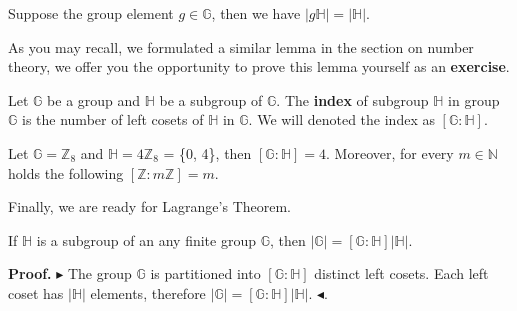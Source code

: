 \documentclass[../lecture-notes-148x210.tex]{subfiles}
\begin{document}
\begin{lemma}
    Suppose the group element $g \in \mathbb{G}$, then we have $\left| g\mathbb{H} \right| = \left| \mathbb{H} \right|$.
\end{lemma}

As you may recall, we formulated a similar lemma in the section on number theory,
we offer you the opportunity to prove this lemma yourself as an \textbf{exercise}.

\begin{definition}
    Let $\mathbb{G}$ be a group and $\mathbb{H}$ be a subgroup of $\mathbb{G}$. 
    The \textbf{index} of subgroup $\mathbb{H}$ in group $\mathbb{G}$ is the number of left cosets of 
    $\mathbb{H}$ in $\mathbb{G}$. We will denoted the index as $\left[ \mathbb{G} : \mathbb{H} \right]$.
\end{definition}

\begin{example}
    Let $\mathbb{G} = \mathbb{Z}_{8}$ and $\mathbb{H} = 4\mathbb{Z}_{8}$ = \{0, 4\}, 
    then $\left[ \mathbb{G} : \mathbb{H} \right] = 4$. Moreover, for every $m \in \mathbb{N}$ holds 
    the following $\left[ \mathbb{Z} : m \mathbb{Z} \right] = m$.
\end{example}


Finally, we are ready for Lagrange's Theorem.

\begin{theorem} [Lagrange]
    If $\mathbb{H}$ is a subgroup of an any finite group $\mathbb{G}$, 
    then $\left| \mathbb{G} \right| = \left[ \mathbb{G} : \mathbb{H} \right] \left| \mathbb{H} \right|$.
\end{theorem}

\textbf{Proof.} 
$\blacktriangleright$ 
The group $\mathbb{G}$ is partitioned into $\left[ \mathbb{G} : \mathbb{H} \right]$ distinct left cosets.
Each left coset has $\left| \mathbb{H} \right|$ elements, therefore 
$\left|\mathbb{G}\right| = \left[ \mathbb{G} : \mathbb{H} \right] \left| \mathbb{H} \right|$.
$\blacktriangleleft$.
\end{document}
